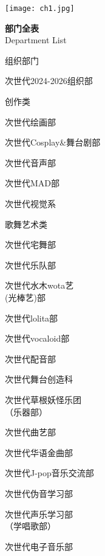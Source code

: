 \vfill
\newpage  %
\normalsize
    \thispagestyle{empty} %
    \noindent %
    \texttt{[image: ch1.jpg]} %
    \restoregeometry %

\newpage
\begin{center}
    \fontsize{30pt}{32pt}\selectfont
    \textbf{\textcolor{truepurple}{部门全表}}  %
    \\[0ex]  %
    \fontsize{18pt}{20pt}\selectfont
    \textcolor{thuorange}{Department List}  %
\end{center}
\flushleft  %
\begin{multicols}{3}  %
    
    \begin{categorysection}{组织部门}  %
        \item 次世代2024-2026组织部
    \end{categorysection}
    
    \begin{categorysection}{创作类}
        \item 次世代绘画部
        \item 次世代Cosplay\&舞台剧部
        \item 次世代音声部
        \item 次世代MAD部
        \item 次世代视觉系
    \end{categorysection}
    
    \begin{categorysection}{歌舞艺术类}
        \item 次世代宅舞部
        \item 次世代乐队部
        \item 次世代水木wota艺\\(光棒艺)部
        \item 次世代lolita部
        \item 次世代vocaloid部
        \item 次世代配音部
        \item 次世代舞台创造科
        \item 次世代草根妖怪乐团\\（乐器部）
        \item 次世代曲艺部
        \item 次世代华语金曲部
        \item 次世代J-pop音乐交流部
        \item 次世代伪音学习部
        \item 次世代声乐学习部\\（学唱歌部）
        \item 次世代电子音乐部
        

\end{categorysection}
\end{multicols}
